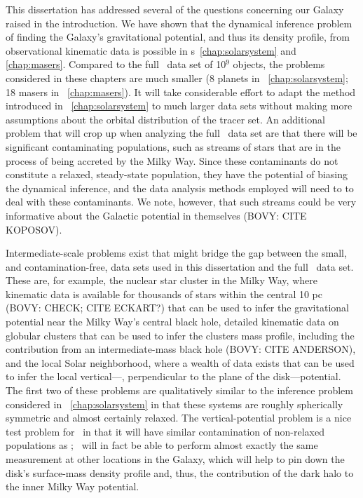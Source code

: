 This dissertation has addressed several of the questions concerning
our Galaxy raised in the introduction. We have shown that the
dynamical inference problem of finding the Galaxy's gravitational
potential, and thus its density profile, from observational kinematic
data is possible in \chaptername s~\ref{chap:solarsystem}
and \ref{chap:masers}. Compared to the full \Gaia\ data set of 10$^9$
objects, the problems considered in these chapters are much smaller (8
planets in \chaptername~\ref{chap:solarsystem}; 18 masers
in \chaptername~\ref{chap:masers}). It will take considerable effort
to adapt the method introduced in \chaptername~\ref{chap:solarsystem}
to much larger data sets without making more assumptions about the
orbital distribution of the tracer set. An additional problem that
will crop up when analyzing the full \Gaia\ data set are that there
will be significant contaminating populations, such as streams of
stars that are in the process of being accreted by the Milky
Way. Since these contaminants do not constitute a relaxed,
steady-state population, they have the potential of biasing the
dynamical inference, and the data analysis methods employed will need
to to deal with these contaminants. We note, however, that such
streams could be very informative about the Galactic potential in
themselves (BOVY: CITE KOPOSOV).

Intermediate-scale problems exist that might bridge the gap between
the small, and contamination-free, data sets used in this dissertation
and the full \Gaia\ data set. These are, for example, the nuclear star
cluster in the Milky Way, where kinematic data is available for
thousands of stars within the central 10 pc (BOVY: CHECK; CITE
ECKART?) that can be used to infer the gravitational potential near
the Milky Way's central black hole, detailed kinematic data on
globular clusters that can be used to infer the clusters mass profile,
including the contribution from an intermediate-mass black hole (BOVY:
CITE ANDERSON), and the local Solar neighborhood, where a wealth of
data exists that can be used to infer the local vertical---\ie,
perpendicular to the plane of the disk---potential. The first two of
these problems are qualitatively similar to the inference problem
considered in \chaptername~\ref{chap:solarsystem} in that these
systems are roughly spherically symmetric and almost certainly
relaxed. The vertical-potential problem is a nice test problem
for \Gaia\ in that it will have similar contamination of non-relaxed
populations as \Gaia; \Gaia\ will in fact be able to perform almost
exactly the same measurement at other locations in the Galaxy, which
will help to pin down the disk's surface-mass density profile and,
thus, the contribution of the dark halo to the inner Milky Way
potential.

